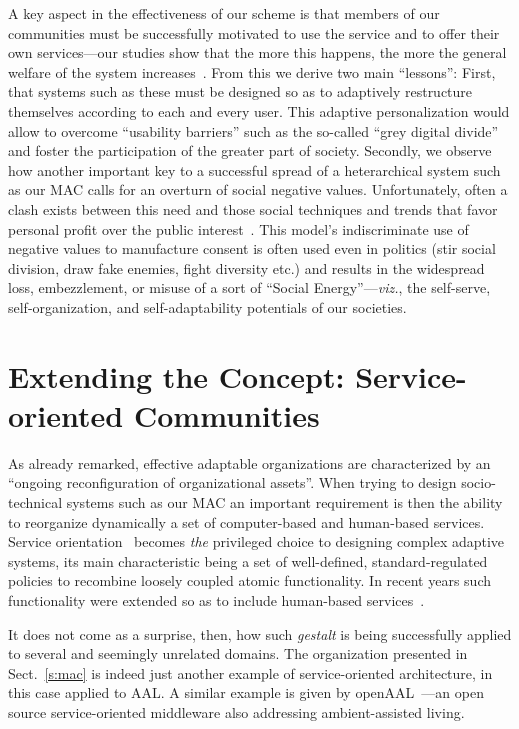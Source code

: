 \documentclass{llncs}
\begin{document}
A key aspect in the effectiveness of our scheme is that members of our communities must be successfully
motivated to use the service and to offer their own services---our studies show that the more this
happens, the more the general welfare of the system increases~\cite{SDGB07a}. From this we derive two
main ``lessons'': First, that systems such as these must be designed so as to adaptively restructure
themselves according to each and every user. This adaptive personalization would allow to overcome
``usability barriers'' such as the so-called ``grey digital divide''~\cite{Mil03} and foster the
participation of the greater part of society. Secondly, we observe how another important key to a
successful spread of a heterarchical system such as our MAC calls for an overturn of social negative
values. Unfortunately, often a clash exists between this need and those social techniques and trends that
favor personal profit over the public interest~\cite{HeCho88,Cho02,MuHCho09}. This model's indiscriminate
use of negative values to manufacture consent is often used even in politics (stir social division, draw
fake enemies, fight diversity etc.) and results in the widespread loss, embezzlement, or misuse 
of a sort of ``Social Energy''---\emph{viz.}, the self-serve, self-organization, and
self-adaptability potentials of our societies.



\section{Extending the Concept: Service-oriented Communities}\label{s:soc}


As already remarked, effective adaptable organizations are characterized by an ``ongoing reconfiguration
of organizational assets''. When trying to design socio-technical systems such as our MAC an important
requirement is then the ability to reorganize dynamically a set of computer-based and human-based
services. Service orientation~\cite{All06} becomes \emph{the\/} privileged choice to designing complex
adaptive systems, its main characteristic being a set of well-defined, standard-regulated policies to
recombine loosely coupled atomic functionality. In recent years such functionality were extended so
as to include human-based services~\cite{BPEL4People,WSHT,STD08}.

It does not come as a surprise, then, how such \emph{gestalt\/} is being successfully applied to several
and seemingly unrelated domains. The organization presented in Sect.~\ref{s:mac} is indeed just another
example of service-oriented architecture, in this case applied to AAL. A similar example is given by
openAAL~\cite{openAALiance10}---an open source service-oriented middleware also
addressing ambient-assisted living.
\end{document}
